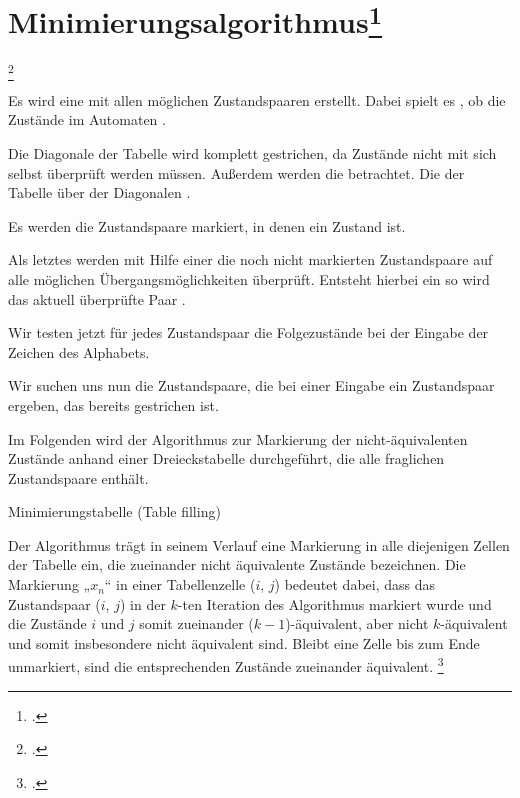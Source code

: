 \documentclass{lehramt-informatik-haupt}
\begin{document}

\section{Minimierungsalgorithmus\footcite[Seite 47-57]{vossen}}

\footcite[Seite 51-62]{theo:fs:1}

Es wird eine  mit allen möglichen
Zustandspaaren erstellt. Dabei spielt es , ob die
Zustände im Automaten .

Die Diagonale der Tabelle wird komplett gestrichen, da Zustände nicht
mit sich selbst überprüft werden müssen. Außerdem werden die
 betrachtet. Die 
der Tabelle über der Diagonalen .

Es werden die Zustandspaare markiert, in denen ein Zustand  ist.

Als letztes werden mit Hilfe einer  die noch
nicht markierten Zustandspaare auf alle möglichen Übergangsmöglichkeiten
überprüft. Entsteht hierbei ein  so
wird das aktuell überprüfte Paar .

Wir testen jetzt für jedes Zustandspaar die Folgezustände bei der
Eingabe der Zeichen des Alphabets.

Wir suchen uns nun die Zustandspaare, die bei einer Eingabe ein
Zustandspaar ergeben, das bereits gestrichen ist.

Im Folgenden wird der Algorithmus zur Markierung der nicht-äquivalenten
Zustände anhand einer Dreieckstabelle durchgeführt, die alle fraglichen
Zustandspaare enthält.

Minimierungstabelle (Table filling)

Der Algorithmus trägt in seinem Verlauf eine Markierung in alle
diejenigen Zellen der Tabelle ein, die zueinander nicht äquivalente
Zustände bezeichnen. Die Markierung „$x_n$“ in einer Tabellenzelle ($i$,
$j$) bedeutet dabei, dass das Zustandspaar ($i$, $j$) in der $k$-ten
Iteration des Algorithmus markiert wurde und die Zustände $i$ und $j$
somit zueinander ($k - 1$)-äquivalent, aber nicht $k$-äquivalent und
somit insbesondere nicht äquivalent sind. Bleibt eine Zelle bis zum Ende
unmarkiert, sind die entsprechenden Zustände zueinander äquivalent.
\footcite[Seite 19]{koenig}


\literatur
\end{document}
